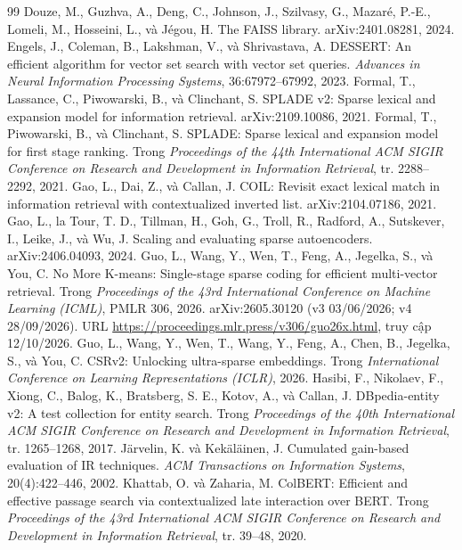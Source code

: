 \documentclass[a4paper,13pt]{extreport}
\theoremstyle{plain}
\begin{document}
\begin{thebibliography}{99}
 Douze, M., Guzhva, A., Deng, C., Johnson, J., Szilvasy, G., Mazaré, P.-E., Lomeli, M., Hosseini, L., và Jégou, H. The FAISS library. arXiv:2401.08281, 2024.
 Engels, J., Coleman, B., Lakshman, V., và Shrivastava, A. DESSERT: An efficient algorithm for vector set search with vector set queries. \emph{Advances in Neural Information Processing Systems}, 36:67972--67992, 2023.
 Formal, T., Lassance, C., Piwowarski, B., và Clinchant, S. SPLADE v2: Sparse lexical and expansion model for information retrieval. arXiv:2109.10086, 2021.
 Formal, T., Piwowarski, B., và Clinchant, S. SPLADE: Sparse lexical and expansion model for first stage ranking. Trong \emph{Proceedings of the 44th International ACM SIGIR Conference on Research and Development in Information Retrieval}, tr. 2288--2292, 2021.
 Gao, L., Dai, Z., và Callan, J. COIL: Revisit exact lexical match in information retrieval with contextualized inverted list. arXiv:2104.07186, 2021.
 Gao, L., la Tour, T. D., Tillman, H., Goh, G., Troll, R., Radford, A., Sutskever, I., Leike, J., và Wu, J. Scaling and evaluating sparse autoencoders. arXiv:2406.04093, 2024.
 Guo, L., Wang, Y., Wen, T., Feng, A., Jegelka, S., và You, C. No More K-means: Single-stage sparse coding for efficient multi-vector retrieval. Trong \emph{Proceedings of the 43rd International Conference on Machine Learning (ICML)}, PMLR 306, 2026. arXiv:2605.30120 (v3 03/06/2026; v4 28/09/2026). URL \url{https://proceedings.mlr.press/v306/guo26x.html}, truy cập 12/10/2026.
 Guo, L., Wang, Y., Wen, T., Wang, Y., Feng, A., Chen, B., Jegelka, S., và You, C. CSRv2: Unlocking ultra-sparse embeddings. Trong \emph{International Conference on Learning Representations (ICLR)}, 2026.
 Hasibi, F., Nikolaev, F., Xiong, C., Balog, K., Bratsberg, S. E., Kotov, A., và Callan, J. DBpedia-entity v2: A test collection for entity search. Trong \emph{Proceedings of the 40th International ACM SIGIR Conference on Research and Development in Information Retrieval}, tr. 1265--1268, 2017.
 Järvelin, K. và Kekäläinen, J. Cumulated gain-based evaluation of IR techniques. \emph{ACM Transactions on Information Systems}, 20(4):422--446, 2002.
 Khattab, O. và Zaharia, M. ColBERT: Efficient and effective passage search via contextualized late interaction over BERT. Trong \emph{Proceedings of the 43rd International ACM SIGIR Conference on Research and Development in Information Retrieval}, tr. 39--48, 2020.

\end{thebibliography}
\end{document}
